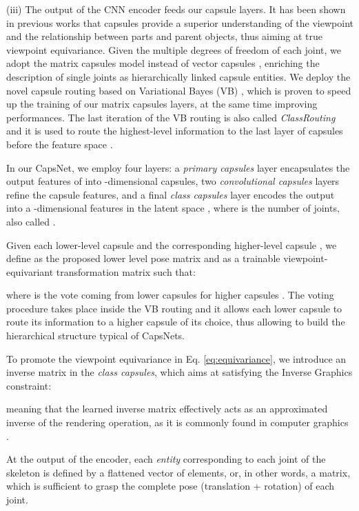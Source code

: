 \documentclass[10pt,twocolumn,letterpaper]{article}
\begin{document}
(iii) The output of the CNN encoder  feeds our capsule layers.
 It has been shown in previous works \cite{sabour2017dynamic, hinton2018matrix, kosiorek2019stacked} that capsules provide a superior understanding of the viewpoint and the relationship between parts and parent objects, thus aiming at true viewpoint equivariance. Given the multiple degrees of freedom of each joint, we adopt the matrix capsules model \cite{hinton2018matrix} instead of vector capsules \cite{sabour2017dynamic}, enriching the description of single joints as hierarchically linked capsule entities. We deploy the novel capsule routing based on Variational Bayes (VB) \cite{ribeiro2020capsule}, which is proven to speed up the training of our matrix capsules layers, at the same time improving performances. The last iteration of the VB routing is also called \textit{ClassRouting} and it is used to route the highest-level information to the last layer of capsules before the feature space .


In our CapsNet, we employ four layers: a \textit{primary capsules} layer encapsulates the output features of  into -dimensional capsules, two \textit{convolutional capsules} layers refine the capsule features, and a final \textit{class capsules} layer encodes the output into a -dimensional features in the latent space , where  is the number of joints, also called .

Given each lower-level capsule  and the corresponding higher-level capsule , we define  as the proposed lower level pose matrix and  as a trainable viewpoint-equivariant transformation matrix such that:
    
where  is the vote coming from lower capsules  for higher capsules . The voting procedure takes place inside the VB routing and it allows each lower capsule  to route its information to a higher capsule  of its choice, thus allowing to build the hierarchical structure typical of CapsNets. 

To promote the viewpoint equivariance in Eq. \ref{eq:equivariance}, we introduce an inverse matrix  in the \textit{class capsules}, which aims at satisfying the Inverse Graphics constraint:

    

 meaning that the learned inverse matrix  effectively acts as an approximated inverse of the rendering operation, as it is commonly found in computer graphics \cite{hinton2011transforming}.
 
At the output of the encoder, each \textit{entity} corresponding to each joint of the skeleton is defined by a flattened vector of  elements, or, in other words, a  matrix, which is sufficient to grasp the complete pose (translation + rotation) of each joint. 
\end{document}
